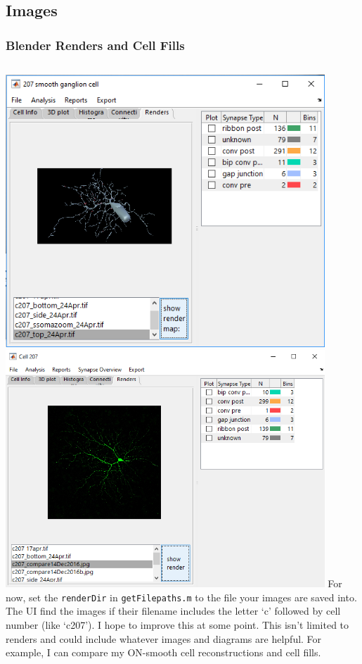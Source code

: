 \documentclass[11pt]{beamer}
\begin{document}
\subsection{Images}
\begin{frame}
	\frametitle{Blender Renders and Cell Fills}
	\begin{columns}
		\includegraphics[width=0.9\textwidth]{c207_render}
		\hskip10pt
		\includegraphics[width=0.9\textwidth]{c207_cellfill}
		For now, set the \texttt{renderDir} in \texttt{getFilepaths.m} to the file your images are saved into. The UI find the images if their filename includes the letter `c' followed by cell number (like `c207'). I hope to improve this at some point.
		\vskip15pt
		This isn't limited to renders and could include whatever images and diagrams are helpful. For example, I can compare my ON-smooth cell reconstructions and cell fills.
	\end{columns}
\end{frame}
\end{document}
